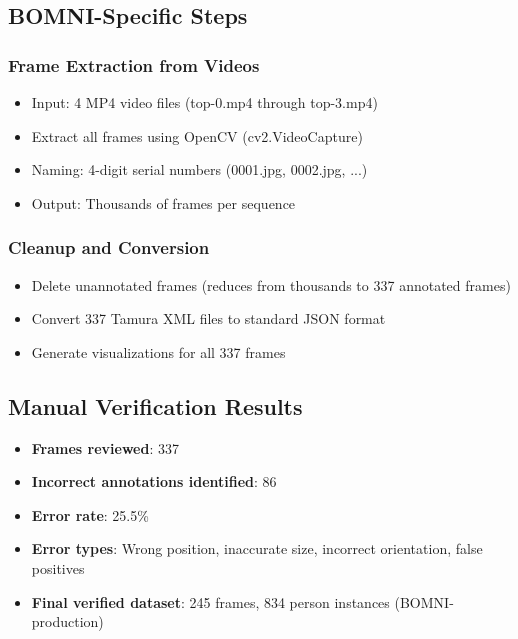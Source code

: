 \documentclass[11pt]{article}
\begin{document}
\subsection{BOMNI-Specific Steps}

\subsubsection{Frame Extraction from Videos}

\begin{itemize}[leftmargin=*]
    \item Input: 4 MP4 video files (top-0.mp4 through top-3.mp4)
    \item Extract all frames using OpenCV (cv2.VideoCapture)
    \item Naming: 4-digit serial numbers (0001.jpg, 0002.jpg, ...)
    \item Output: Thousands of frames per sequence
\end{itemize}

\subsubsection{Cleanup and Conversion}

\begin{itemize}[leftmargin=*]
    \item Delete unannotated frames (reduces from thousands to 337 annotated frames)
    \item Convert 337 Tamura XML files to standard JSON format
    \item Generate visualizations for all 337 frames
\end{itemize}

\subsection{Manual Verification Results}

\begin{itemize}[leftmargin=*]
    \item \textbf{Frames reviewed}: 337
    \item \textbf{Incorrect annotations identified}: 86
    \item \textbf{Error rate}: 25.5\%
    \item \textbf{Error types}: Wrong position, inaccurate size, incorrect orientation, false positives
    \item \textbf{Final verified dataset}: 245 frames, 834 person instances (BOMNI-production)
\end{itemize}
\end{document}
